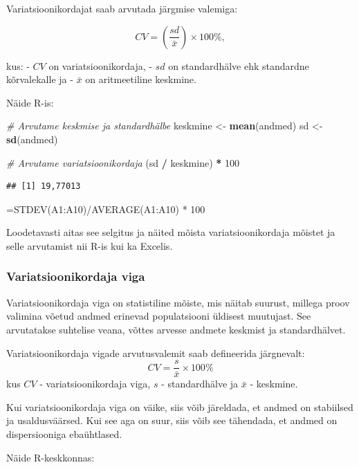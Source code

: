 \documentclass[
]{book}
\newenvironment{Shaded}{\begin{snugshade}}{\end{snugshade}}
\newcommand{\CommentTok}[1]{\textcolor[rgb]{0.56,0.35,0.01}{\textit{#1}}}
\newcommand{\DecValTok}[1]{\textcolor[rgb]{0.00,0.00,0.81}{#1}}
\newcommand{\FunctionTok}[1]{\textcolor[rgb]{0.13,0.29,0.53}{\textbf{#1}}}
\newcommand{\NormalTok}[1]{#1}
\newcommand{\OtherTok}[1]{\textcolor[rgb]{0.56,0.35,0.01}{#1}}
\newcommand{\SpecialCharTok}[1]{\textcolor[rgb]{0.81,0.36,0.00}{\textbf{#1}}}
\renewenvironment{Shaded} {\begin{snugshade}\footnotesize} {\end{snugshade}}
\begin{document}
Variatsioonikordajat saab arvutada järgmise valemiga:

\[
CV = \left(\frac{sd}{\bar{x}}\right) \times 100\%,
\]

kus:
- \(CV\) on variatsioonikordaja,
- \(sd\) on standardhälve ehk standardne kõrvalekalle ja
- \(\bar{x}\) on aritmeetiline keskmine.

Näide R-is:

\begin{Shaded}
\begin{Highlighting}[]
\CommentTok{\# Arvutame keskmise ja standardhälbe}
\NormalTok{keskmine }\OtherTok{\textless{}{-}} \FunctionTok{mean}\NormalTok{(andmed)}
\NormalTok{sd }\OtherTok{\textless{}{-}} \FunctionTok{sd}\NormalTok{(andmed)}

\CommentTok{\# Arvutame variatsioonikordaja}
\NormalTok{(sd }\SpecialCharTok{/}\NormalTok{ keskmine) }\SpecialCharTok{*} \DecValTok{100}
\end{Highlighting}
\end{Shaded}

\begin{verbatim}
## [1] 19,77013
\end{verbatim}

=STDEV(A1:A10)/AVERAGE(A1:A10) * 100

Loodetavasti aitas see selgitus ja näited mõista variatsioonikordaja mõistet ja selle arvutamist nii R-is kui ka Excelis.

\subsubsection{Variatsioonikordaja viga}\label{variatsioonikordaja-viga}

Variatsioonikordaja viga on statistiline mõiste, mis näitab suurust, millega proov valimina võetud andmed erinevad populatsiooni üldisest muutujast. See arvutatakse suhtelise veana, võttes arvesse andmete keskmist ja standardhälvet.

Variatsioonikordaja vigade arvutusvalemit saab defineerida järgnevalt:
\[ CV = \frac{s}{\bar{x}} \times 100\% \]
kus
\(CV\) - variatsioonikordaja viga,
\(s\) - standardhälve ja
\(\bar{x}\) - keskmine.

Kui variatsioonikordaja viga on väike, siis võib järeldada, et andmed on stabiilsed ja usaldusväärsed. Kui see aga on suur, siis võib see tähendada, et andmed on dispersiooniga ebaühtlased.

Näide R-keskkonnas:
\end{document}
